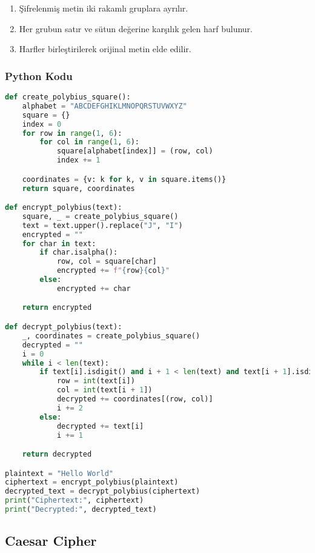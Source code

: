 \begin{enumerate}
    \item Şifrelenmiş metin iki rakamlı gruplara ayrılır.
    \item Her grubun satır ve sütun değerine karşılık gelen harf bulunur.
    \item Harfler birleştirilerek orijinal metin elde edilir.
\end{enumerate}

\subsubsection{Python Kodu}

\begin{lstlisting}[language=Python]
def create_polybius_square():
    alphabet = "ABCDEFGHIKLMNOPQRSTUVWXYZ"
    square = {}
    index = 0
    for row in range(1, 6):
        for col in range(1, 6):
            square[alphabet[index]] = (row, col)
            index += 1

    coordinates = {v: k for k, v in square.items()}
    return square, coordinates

def encrypt_polybius(text):
    square, _ = create_polybius_square()
    text = text.upper().replace("J", "I")
    encrypted = ""
    for char in text:
        if char.isalpha():
            row, col = square[char]
            encrypted += f"{row}{col}"
        else:
            encrypted += char

    return encrypted

def decrypt_polybius(text):
    _, coordinates = create_polybius_square()
    decrypted = ""
    i = 0
    while i < len(text):
        if text[i].isdigit() and i + 1 < len(text) and text[i + 1].isdigit():
            row = int(text[i])
            col = int(text[i + 1])
            decrypted += coordinates[(row, col)]
            i += 2
        else:
            decrypted += text[i]
            i += 1

    return decrypted

plaintext = "Hello World"
ciphertext = encrypt_polybius(plaintext)
decrypted_text = decrypt_polybius(ciphertext)
print("Ciphertext:", ciphertext)
print("Decrypted:", decrypted_text)
\end{lstlisting}

\newpage

\subsection{Caesar Cipher}

